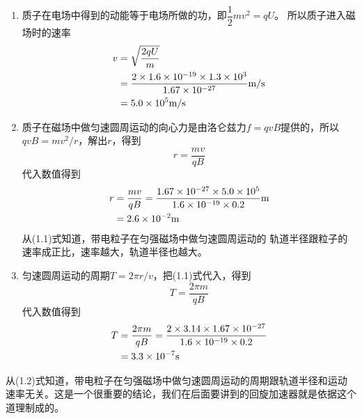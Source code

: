 \begin{solution}
    \begin{enumerate}
        \item 质子在电场中得到的动能等于电场所做的功，即$\dfrac{1}{2}mv^2=qU$。
        所以质子进入磁场时的速率
        \[\begin{split}
            v&=\sqrt{\frac{2qU}{m}}\\
            &=\frac{2\times 1.6\times 10^{-19}\times1.3\times10^3}{1.67\times 10^{-27}}\text{m}/\text{s}\\
            &=5.0\times 10^5\text{m}/\text{s}
        \end{split}\]
        \item 质子在磁场中做匀速圆周运动的向心力是由洛仑兹力$f=qvB$提供的，所以$qvB=mv^2/r$，解出$r$，得到
        \begin{equation}
            r=\frac{mv}{qB}
        \end{equation}
        代入数值得到
       \[\begin{split}
           r&=\frac{mv}{qB}=\frac{1.67\times 10^{-27}\times 5.0\times 10^5}{1.6\times 10^{-19}\times 0.2}{\rm m}\\
           &=2.6\times 10^{-2}{\rm m}
       \end{split}\]
        从(1.1)式知道，带电粒子在匀强磁场中做匀速圆周运动的
        轨道半径跟粒子的速率成正比，速率越大，轨道半径也越大。
        
        \item 匀速圆周运动的周期$T=2\pi r/v$，把(1.1)式代入，得到
\begin{equation}
    T=\frac{2\pi m}{qB}
\end{equation}
        代入数值得到
        \[\begin{split}
            T&=\frac{2\pi m}{qB}=\frac{2\times 3.14\times 1.67\times 10^{-27}}{1.6\times 10^{-19}\times 0.2}\\
            &=3.3\times 10^{-7}{\rm s}
        \end{split}\]
    \end{enumerate}
\end{solution}

从(1.2)式知道，带电粒子在匀强磁场中做匀速圆周运动的周期跟轨道半径和运动速率无关。这是一个很重要的结论，我们在后面要讲到的回旋加速器就是依据这个道理制成的。
        
